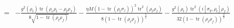 \documentclass[]{elsarticle}
\begin{document}
\begin{appendices}
\begin{equation}
\begin{aligned}
		=&-\frac{g^{2}(\rho_{t})\operatorname{tr}\left(\rho_{e}\rho_{t}-\rho_t \rho_{f}\right)}{8\sqrt{1-\operatorname{tr}\left(\rho_t \rho_{f}\right)}}-\frac{\eta M (1-\operatorname{tr}(\rho_{t}\sigma_z))^{2}\operatorname{tr}^{2}\left(\rho_t \rho_{f}\right)}{8\left(1-\operatorname{tr}\left(\rho_t \rho_{f}\right)\right)^{\frac{3}{2}}}-\frac{g^{2}\left(\rho_t\right)\operatorname{tr}^2\left(i\left[\sigma_y, \rho_t\right]\rho_{f}\right)}{32\left(1-\operatorname{tr}\left(\rho_t \rho_{f}\right)\right)^{\frac{3}{2}}}
	\end{aligned}
\end{equation}
\end{appendices}



\end{document}
